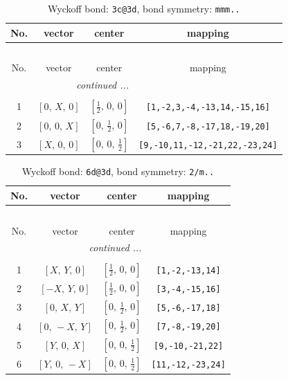 \documentclass[fleqn,8pt]{jsarticle}
\begin{document}
\renewcommand{\arraystretch}{1.2}
\begin{longtable}{cccc}
\caption{Wyckoff bond: {\tt 3c@3d}, bond symmetry: {\tt mmm..}}
 \\
 \hline \hline
No. & vector & center & mapping \\ \hline \endfirsthead

\multicolumn{3}{l}{\tablename\ \thetable{}} \\
 \hline \hline
No. & vector & center & mapping \\ \hline \endhead

 \hline \hline
\multicolumn{3}{r}{\footnotesize\it continued ...} \\ \endfoot

 \hline \hline
\multicolumn{3}{r}{} \\ \endlastfoot

1 & $\left[ 0,\, X,\, 0 \right]$ & $\left[ \frac{1}{2},\, 0,\, 0 \right]$ & {\tt [1,-2,3,-4,-13,14,-15,16]} \\ \hline
2 & $\left[ 0,\, 0,\, X \right]$ & $\left[ 0,\, \frac{1}{2},\, 0 \right]$ & {\tt [5,-6,7,-8,-17,18,-19,20]} \\ \hline
3 & $\left[ X,\, 0,\, 0 \right]$ & $\left[ 0,\, 0,\, \frac{1}{2} \right]$ & {\tt [9,-10,11,-12,-21,22,-23,24]} \\
\end{longtable}
\renewcommand{\arraystretch}{1.2}
\begin{longtable}{cccc}
\caption{Wyckoff bond: {\tt 6d@3d}, bond symmetry: {\tt 2/m..}}
 \\
 \hline \hline
No. & vector & center & mapping \\ \hline \endfirsthead

\multicolumn{3}{l}{\tablename\ \thetable{}} \\
 \hline \hline
No. & vector & center & mapping \\ \hline \endhead

 \hline \hline
\multicolumn{3}{r}{\footnotesize\it continued ...} \\ \endfoot

 \hline \hline
\multicolumn{3}{r}{} \\ \endlastfoot

1 & $\left[ X,\, Y,\, 0 \right]$ & $\left[ \frac{1}{2},\, 0,\, 0 \right]$ & {\tt [1,-2,-13,14]} \\ \hline
2 & $\left[ - X,\, Y,\, 0 \right]$ & $\left[ \frac{1}{2},\, 0,\, 0 \right]$ & {\tt [3,-4,-15,16]} \\ \hline
3 & $\left[ 0,\, X,\, Y \right]$ & $\left[ 0,\, \frac{1}{2},\, 0 \right]$ & {\tt [5,-6,-17,18]} \\ \hline
4 & $\left[ 0,\, - X,\, Y \right]$ & $\left[ 0,\, \frac{1}{2},\, 0 \right]$ & {\tt [7,-8,-19,20]} \\ \hline
5 & $\left[ Y,\, 0,\, X \right]$ & $\left[ 0,\, 0,\, \frac{1}{2} \right]$ & {\tt [9,-10,-21,22]} \\ \hline
6 & $\left[ Y,\, 0,\, - X \right]$ & $\left[ 0,\, 0,\, \frac{1}{2} \right]$ & {\tt [11,-12,-23,24]} \\
\end{longtable}
\end{document}

